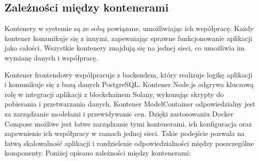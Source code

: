 \subsection{Zależności między kontenerami}
Kontenery w systemie są ze sobą powiązane, umożliwiając ich współpracę. Każdy kontener komunikuje się z innymi, zapewniając sprawne funkcjonowanie aplikacji jako całości. Wszystkie kontenery znajdują się na jednej sieci, co umożliwia im wymianę danych i współpracę. 

Kontener frontendowy współpracuje z backendem, który realizuje logikę aplikacji i komunikuje się z bazą danych PostgreSQL. Kontener Node.js odgrywa kluczową rolę w integracji aplikacji z blockchainem Solany, wykonując skrypty do pobierania i przetwarzania danych. Kontener  ModelContainer odpowiedzialny jest za zarządzanie modelami i przewidywanie cen. Dzięki zastosowaniu Docker Compose możliwe jest łatwe zarządzanie tymi kontenerami, ich konfiguracja oraz zapewnienie ich współpracy w ramach jednej sieci. Takie podejście pozwala na łatwą skalowalność aplikacji i rozdzielenie odpowiedzialności między poszczególne komponenty. Poniżej opisano zależności między kontenerami:
